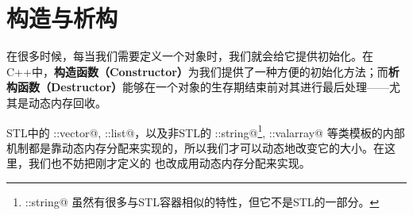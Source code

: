 \section{构造与析构}
在很多时候，每当我们需要定义一个对象时，我们就会给它提供初始化。在C++中，\textbf{构造函数（Constructor）}为我们提供了一种方便的初始化方法；而\textbf{析构函数（Destructor）}能够在一个对象的生存期结束前对其进行最后处理——尤其是动态内存回收。\par
STL中的 \lstinline@std::vector@, \lstinline@std::list@，以及非STL的 \lstinline@std::string@\footnote{\lstinline@std::string@ 虽然有很多与STL容器相似的特性，但它不是STL的一部分。}, \lstinline@std::valarray@ 等类模板的内部机制都是靠动态内存分配来实现的，所以我们才可以动态地改变它的大小。在这里，我们也不妨把刚才定义的 \lstinline@valarri@ 也改成用动态内存分配来实现。\par

